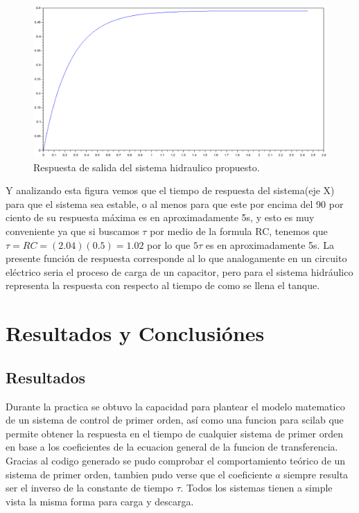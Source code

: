 \documentclass[letterpaper,spanish,12pt]{report}
\begin{document}
\begin{figure}[h]
	\centering
		\includegraphics[width=1.00\textwidth]{Grafica2.eps}
	\caption{Respuesta de salida del sistema hidraulico propuesto.}
	\label{graf:2}
\end{figure}

Y analizando esta figura vemos que el tiempo de respuesta del sistema(eje X) para que el sistema sea estable, o al menos para que este por encima del 90 por ciento de su respuesta m\'axima es en aproximadamente 5s, y esto es muy conveniente ya que si buscamos $\tau$ por medio de la formula RC, tenemos que $\tau = RC = (2.04)(0.5) = 1.02$
por lo que $5\tau$ es en aproximadamente 5s.
La presente funci\'on de respuesta corresponde al lo que analogamente en un circuito el\'ectrico seria el proceso de carga de un capacitor, pero para el sistema hidr\'aulico representa la respuesta con respecto al tiempo de como se llena el tanque.

\chapter{Resultados y Conclusi\'ones}
\section{Resultados}
Durante la practica se obtuvo la capacidad para plantear el modelo matematico de un sistema de control de primer orden, as\'i como una funcion para scilab que permite obtener la respuesta en el tiempo de cualquier sistema de primer orden en base a los coeficientes de la ecuacion general de la funcion de transferencia. Gracias al codigo generado se pudo comprobar el comportamiento te\'orico de un sistema de primer orden, tambien pudo verse que el coeficiente $a$ siempre resulta ser el inverso de la constante de tiempo $\tau$. Todos los sistemas tienen a simple vista la misma forma para carga y descarga.   
\end{document}
